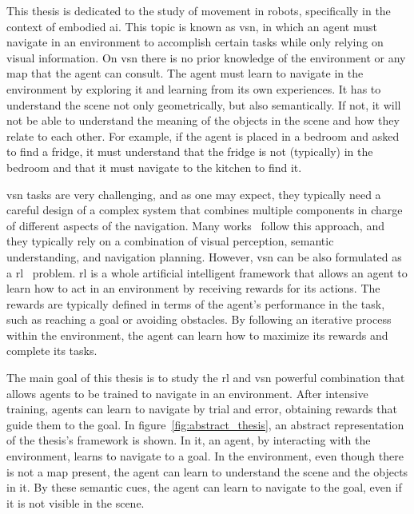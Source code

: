 This thesis is dedicated to the study of movement in robots, specifically in the context of embodied \acrshort{ai}.
This topic is known as \acrfull{vsn}, in which an agent must navigate in an environment to accomplish certain tasks while only relying on visual information.
On \acrshort{vsn} there is no prior knowledge of the environment or any map that the agent can consult.
The agent must learn to navigate in the environment by exploring it and learning from its own experiences.
It has to understand the scene not only geometrically, but also semantically.
If not, it will not be able to understand the meaning of the objects in the scene and how they relate to each other.
For example, if the agent is placed in a bedroom and asked to find a fridge, it must understand that the fridge is not (typically) in the bedroom and that it must navigate to the kitchen to find it.

\acrshort{vsn} tasks are very challenging, and as one may expect, they typically need a careful design of a complex system that combines multiple components in charge of different aspects of the navigation.
Many works~\cite{newcombe2011, thrun2001, jones2011, sattler2018, Kazerouni2022, campos2021, labbe2022, zhang2018, rosinol2020, jin2023} follow this approach, and they typically rely on a combination of visual perception, semantic understanding, and navigation planning.
However, \acrshort{vsn} can be also formulated as a \acrfull{rl}~\cite{sutton2018} problem.
\acrshort{rl} is a whole artificial intelligent framework that allows an agent to learn how to act in an environment by receiving rewards for its actions.
The rewards are typically defined in terms of the agent's performance in the task, such as reaching a goal or avoiding obstacles.
By following an iterative process within the environment, the agent can learn how to maximize its rewards and complete its tasks.

The main goal of this thesis is to study the \acrshort{rl} and \acrshort{vsn} powerful combination that allows agents to be trained to navigate in an environment.
After intensive training, agents can learn to navigate by trial and error, obtaining rewards that guide them to the goal.
In figure~\ref{fig:abstract_thesis}, an abstract representation of the thesis's framework is shown.
In it, an agent, by interacting with the environment, learns to navigate to a goal.
In the environment, even though there is not a map present, the agent can learn to understand the scene and the objects in it.
By these semantic cues, the agent can learn to navigate to the goal, even if it is not visible in the scene.

